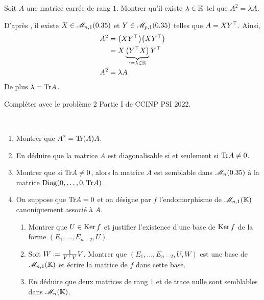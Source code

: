 \begin{exercice} 
    Soit $A$ une matrice carrée de rang $1$. Montrer qu'il existe $\lambda \in \mathbb{K}$ tel que $A^2 = \lambda A$.
\end{exercice}

\begin{solution}
    D'après , il existe $X \in \mathscr{M}_{n,1}(0.35)$ et $Y \in \mathscr{M}_{p,1}(0.35)$ telles que $A = X Y^\top$. Ainsi, 
    \begin{align*}
        A^2 &= \big(X \Trsp{Y}\big) \big(X \Trsp{Y}\big) \\
        &= X \underbrace{\big( \Trsp{Y} X \big)}_{ \defeq \lambda \in \K} \Trsp{Y} \\
        A^2 &= \lambda A
    \end{align*}
    De plus $\lambda = \mathrm{Tr} A$.
\end{solution}

Compléter avec le problème 2 Partie I de CCINP PSI 2022.

\begin{exercice}
     \\
    \begin{enumerate}
        \item Montrer que $A^2 = \mathrm{Tr} (A) A$.
        \item En déduire que la matrice $A$ est diagonalisable si et seulement si $\mathrm{Tr} A \not= 0$.
        \item Montrer que si $\mathrm{Tr} A \not= 0$, alors la matrice $A$ est semblable dans $\mathscr{M}_n(0.35)$ à la matrice $\mathrm{Diag}(0, \dots, 0, \mathrm{Tr} A)$.
        \item On suppose que $\mathrm{Tr} A = 0$ et on désigne par $f$ l'endomorphisme de $\mathscr{M}_{n,1}(\mathbb{K})$ canoniquement associé à $A$. 
        \begin{enumerate}
            \item Montrer que $U \in \mathrm{Ker}\, f$ et justifier l'existence d'une base de $\mathrm{Ker}\, f$ de la forme $(E_1, \dots, E_{n-2}, U)$. 
            \item Soit $W \defeq \frac{1}{\Trsp{V}V}V$. Montrer que $(E_1, \dots, E_{n-2}, U, W)$ est une base de $\mathscr{M}_{n,1}(\mathbb{K})$ et écrire la matrice de $f$ dans cette base. 
            \item En déduire que deux matrices de rang $1$ et de trace nulle sont semblables dans $\mathscr{M}_n(\mathbb{K})$.
        \end{enumerate}
    \end{enumerate}
\end{exercice}

\begin{solution}
    
\end{solution}